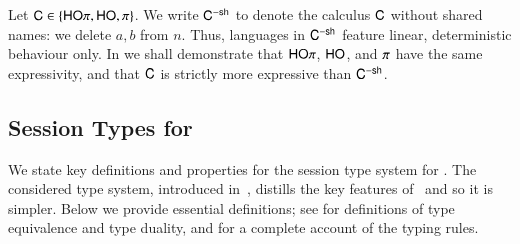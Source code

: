 \documentclass[preprint,11pt]{elsarticle}
\begin{document}
{\begin{enumerate}[$\bullet$]
\end{enumerate}
%
Let $\mathsf{C} \in \{\mathsf{HO}\pi, \mathsf{HO}, \pi\}$. We write 
$\mathsf{C}^{-\mathsf{sh}}$ to denote the calculus $\mathsf{C}$ without shared names:
we delete $a,b$ from $n$. 
Thus, languages in $\mathsf{C}^{-\mathsf{sh}}$ feature linear, deterministic behaviour only.
In 
we shall demonstrate that 
$\mathsf{HO}\pi$, $\mathsf{HO}$, and $\pi$ have the same expressivity,
and that $\mathsf{C}$ is strictly more expressive than $\mathsf{C}^{-\mathsf{sh}}$.



\subsection{Session Types for \HOp}
\label{sec:types}

We state key definitions and properties for the session type system for \HOp.
The considered type system,
introduced in~\cite{KouzapasPY17},
 distills the key features of~\cite{tlca07,MostrousY15} and so it is simpler.
 Below we provide essential definitions; see  for definitions of type equivalence and type duality, and 
for a complete account of the typing rules.




}
\end{document}
